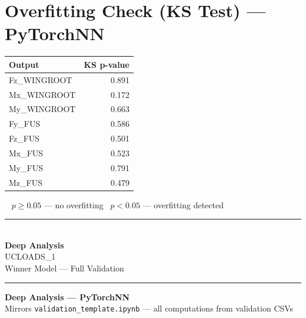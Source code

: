 \documentclass[9pt,a4paper]{article}
\begin{document}
\section{Overfitting Check (KS Test) --- PyTorchNN}
\begin{minipage}{\linewidth}
\renewcommand{\arraystretch}{1.15}
\begin{tabular}{|l|r|}
  \hline\textbf{Output} & \textbf{KS p-value} \\ \hline
  Fz\_WINGROOT & \cellcolor{passgreen}0.891 \\ \hline
  Mx\_WINGROOT & \cellcolor{passgreen}0.172 \\ \hline
  My\_WINGROOT & \cellcolor{passgreen}0.663 \\ \hline
  Fy\_FUS & \cellcolor{passgreen}0.586 \\ \hline
  Fz\_FUS & \cellcolor{passgreen}0.501 \\ \hline
  Mx\_FUS & \cellcolor{passgreen}0.523 \\ \hline
  My\_FUS & \cellcolor{passgreen}0.791 \\ \hline
  Mz\_FUS & \cellcolor{passgreen}0.479 \\ \hline
\end{tabular}
\par\vspace{4pt}
{\footnotesize \colorbox{passgreen}{\ } $p\geq 0.05$ --- no overfitting\enspace \colorbox{failred}{\ } $p<0.05$ --- overfitting detected}
\end{minipage}
\clearpage
\thispagestyle{empty}
\vspace*{\fill}
\begin{center}
  \textcolor{sepgray}{\rule{0.40\linewidth}{1pt}}\\[20pt]
  {\Huge\bfseries\color{primary} Deep Analysis}\\[10pt]
  {\large\color{sepgray} UCLOADS\_1}\\[6pt]
  {\normalsize\color{sepgray} Winner Model --- Full Validation}\\[20pt]
  \textcolor{sepgray}{\rule{0.40\linewidth}{1pt}}
\end{center}
\vspace*{\fill}
\clearpage
\label{sec:deepanalysis}
\begin{center}
  {\normalsize\bfseries\color{primary} Deep Analysis --- PyTorchNN}\\[2pt]
  {\small\color{sepgray} Mirrors \texttt{validation\_template.ipynb} --- all computations from validation CSVs}
\end{center}
\end{document}
